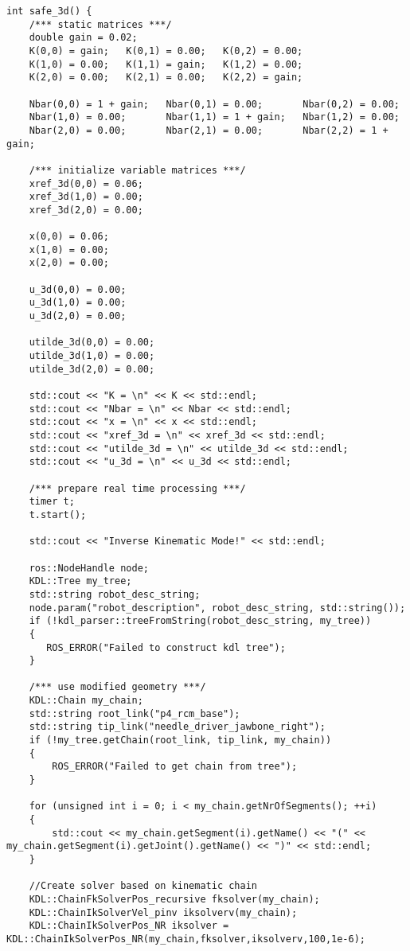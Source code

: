 \begin{lstlisting}[language=gedit]
int safe_3d() {
    /*** static matrices ***/
    double gain = 0.02;
    K(0,0) = gain;   K(0,1) = 0.00;   K(0,2) = 0.00;
    K(1,0) = 0.00;   K(1,1) = gain;   K(1,2) = 0.00;
    K(2,0) = 0.00;   K(2,1) = 0.00;   K(2,2) = gain;
 
    Nbar(0,0) = 1 + gain;   Nbar(0,1) = 0.00;       Nbar(0,2) = 0.00;
    Nbar(1,0) = 0.00;       Nbar(1,1) = 1 + gain;   Nbar(1,2) = 0.00;
    Nbar(2,0) = 0.00;       Nbar(2,1) = 0.00;       Nbar(2,2) = 1 + gain;

    /*** initialize variable matrices ***/
    xref_3d(0,0) = 0.06;
    xref_3d(1,0) = 0.00;
    xref_3d(2,0) = 0.00;

    x(0,0) = 0.06;
    x(1,0) = 0.00;
    x(2,0) = 0.00;

    u_3d(0,0) = 0.00;
    u_3d(1,0) = 0.00;
    u_3d(2,0) = 0.00;

    utilde_3d(0,0) = 0.00;
    utilde_3d(1,0) = 0.00;
    utilde_3d(2,0) = 0.00;

    std::cout << "K = \n" << K << std::endl;
    std::cout << "Nbar = \n" << Nbar << std::endl;
    std::cout << "x = \n" << x << std::endl;
    std::cout << "xref_3d = \n" << xref_3d << std::endl;
    std::cout << "utilde_3d = \n" << utilde_3d << std::endl;
    std::cout << "u_3d = \n" << u_3d << std::endl;

    /*** prepare real time processing ***/ 
    timer t;
    t.start();

    std::cout << "Inverse Kinematic Mode!" << std::endl;

    ros::NodeHandle node;
    KDL::Tree my_tree;
    std::string robot_desc_string;
    node.param("robot_description", robot_desc_string, std::string());
    if (!kdl_parser::treeFromString(robot_desc_string, my_tree))
    {
       ROS_ERROR("Failed to construct kdl tree");
    }

    /*** use modified geometry ***/
    KDL::Chain my_chain;
    std::string root_link("p4_rcm_base");
    std::string tip_link("needle_driver_jawbone_right");
    if (!my_tree.getChain(root_link, tip_link, my_chain))
    {
        ROS_ERROR("Failed to get chain from tree");
    }

    for (unsigned int i = 0; i < my_chain.getNrOfSegments(); ++i)
    {
        std::cout << my_chain.getSegment(i).getName() << "(" << my_chain.getSegment(i).getJoint().getName() << ")" << std::endl;
    }

    //Create solver based on kinematic chain
    KDL::ChainFkSolverPos_recursive fksolver(my_chain);
    KDL::ChainIkSolverVel_pinv iksolverv(my_chain);
    KDL::ChainIkSolverPos_NR iksolver = KDL::ChainIkSolverPos_NR(my_chain,fksolver,iksolverv,100,1e-6);


\end{lstlisting}

